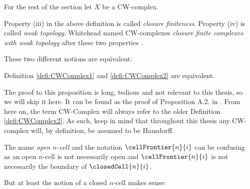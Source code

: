 
For the rest of the section let $X$ be a CW-complex.

\begin{rem}
    Property (iii) in the above definition is called \emph{closure finiteness}.
    Property (iv) is called \emph{weak topology}.
    Whitehead named CW-complexes \emph{closure finite complexes with weak topology} after these two properties \cite{Whitehead2018}.
\end{rem}

These two different notions are equivalent:

\begin{prop}
    Definition \ref{defi:CWComplex1} and \ref{defi:CWComplex2} are equivalent.
\end{prop}

The proof to this proposition is long, tedious and not relevant to this thesis, so we will skip it here.
It can be found as the proof of Proposition A.2. in \cite{Hatcher2001}.
From here on, the term CW-Complex will always refer to the older Definition \ref{defi:CWComplex2}.
As such, keep in mind that throughout this thesis any CW-complex will, by definition, be assumed to be Hausdorff.

\begin{rem}
    The name \emph{open $n$-cell} and the notation $\cellFrontier{n}{i}$ can be confusing as an open $n$-cell is not necessarily open and $\cellFrontier{n}{i}$  is not necessarily the boundary of $\closedCell{n}{i}$.
\end{rem}

But at least the notion of a closed $n$-cell makes sense:

